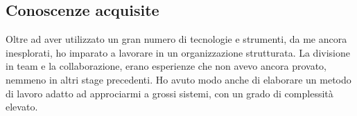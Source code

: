 \subsection{Conoscenze acquisite}
Oltre ad aver utilizzato un gran numero di tecnologie e strumenti, da me ancora inesplorati, ho imparato a lavorare in un organizzazione strutturata. La divisione in team e la collaborazione, erano esperienze che non avevo ancora provato, nemmeno in altri stage precedenti. Ho avuto modo anche di elaborare un metodo di lavoro adatto ad approciarmi a grossi sistemi, con un grado di complessità elevato.